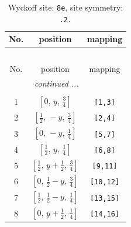 \documentclass[fleqn,8pt]{jsarticle}
\begin{document}
\begin{longtable}{ccc}
\caption{Wyckoff site: {\tt 8e}, site symmetry: {\tt .2.}}
 \\
 \hline \hline
No. & position & mapping \\ \hline \endfirsthead

\multicolumn{2}{l}{\tablename\ \thetable{}} \\
 \hline \hline
No. & position & mapping \\ \hline \endhead

 \hline \hline
\multicolumn{2}{r}{\footnotesize\it continued ...} \\ \endfoot

 \hline \hline
\multicolumn{2}{r}{} \\ \endlastfoot

1 & $\left[ 0,\, y,\, \frac{3}{4} \right]$ & {\tt [1,3]} \\ \hline
2 & $\left[ \frac{1}{2},\, - y,\, \frac{3}{4} \right]$ & {\tt [2,4]} \\ \hline
3 & $\left[ 0,\, - y,\, \frac{1}{4} \right]$ & {\tt [5,7]} \\ \hline
4 & $\left[ \frac{1}{2},\, y,\, \frac{1}{4} \right]$ & {\tt [6,8]} \\ \hline
5 & $\left[ \frac{1}{2},\, y + \frac{1}{2},\, \frac{3}{4} \right]$ & {\tt [9,11]} \\ \hline
6 & $\left[ 0,\, \frac{1}{2} - y,\, \frac{3}{4} \right]$ & {\tt [10,12]} \\ \hline
7 & $\left[ \frac{1}{2},\, \frac{1}{2} - y,\, \frac{1}{4} \right]$ & {\tt [13,15]} \\ \hline
8 & $\left[ 0,\, y + \frac{1}{2},\, \frac{1}{4} \right]$ & {\tt [14,16]} \\
\end{longtable}
\renewcommand{\arraystretch}{1.2}
\end{document}

